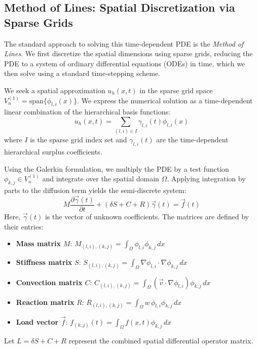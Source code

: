 \documentclass[12pt, a4paper]{article}
\begin{document}
\subsection{Method of Lines: Spatial Discretization via Sparse Grids}
The standard approach to solving this time-dependent PDE is the \textit{Method of Lines}. We first discretize the spatial dimensions using sparse grids, reducing the PDE to a system of ordinary differential equations (ODEs) in time, which we then solve using a standard time-stepping scheme.

We seek a spatial approximation $u_h(x,t)$ in the sparse grid space $V_n^{(1)} = \text{span}\{\phi_{l,i}(x)\}$. We express the numerical solution as a time-dependent linear combination of the hierarchical basis functions:
\begin{equation}
u_h(x,t) = \sum_{(l,i) \in I} \gamma_{l,i}(t) \phi_{l,i}(x)
\end{equation}
where $I$ is the sparse grid index set and $\gamma_{l,i}(t)$ are the time-dependent hierarchical surplus coefficients.

Using the Galerkin formulation, we multiply the PDE by a test function $\phi_{k,j} \in V_n^{(1)}$ and integrate over the spatial domain $\Omega$. Applying integration by parts to the diffusion term yields the semi-discrete system:
\begin{equation}
M \frac{\partial \vec{\gamma}(t)}{\partial t} + (\delta S + C + R) \vec{\gamma}(t) = \vec{f}(t)
\end{equation}
Here, $\vec{\gamma}(t)$ is the vector of unknown coefficients. The matrices are defined by their entries:
\begin{itemize}
    \item \textbf{Mass matrix} $M$: $M_{(l,i),(k,j)} = \int_\Omega \phi_{l,i} \phi_{k,j} \, dx$
    \item \textbf{Stiffness matrix} $S$: $S_{(l,i),(k,j)} = \int_\Omega \nabla\phi_{l,i} \cdot \nabla\phi_{k,j} \, dx$
    \item \textbf{Convection matrix} $C$: $C_{(l,i),(k,j)} = \int_\Omega (\vec{v} \cdot \nabla\phi_{l,i}) \phi_{k,j} \, dx$
    \item \textbf{Reaction matrix} $R$: $R_{(l,i),(k,j)} = \int_\Omega w \, \phi_{l,i} \phi_{k,j} \, dx$
    \item \textbf{Load vector} $\vec{f}$: $f_{(k,j)}(t) = \int_\Omega f(x,t) \phi_{k,j} \, dx$
\end{itemize}
Let $L = \delta S + C + R$ represent the combined spatial differential operator matrix.
\end{document}
